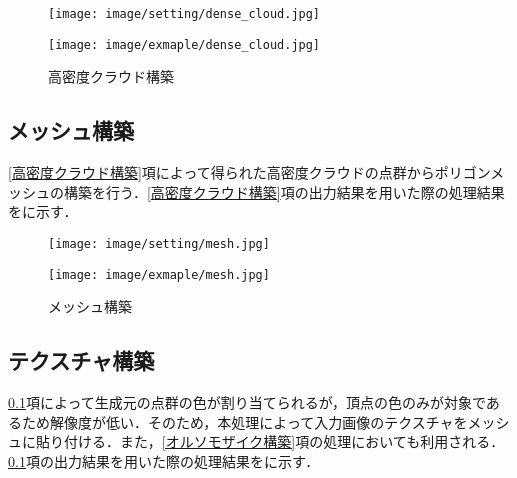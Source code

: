       \begin{figure}[tbp]
        \begin{minipage}[c]{0.45\hsize}
          \centering
          \texttt{[image: image/setting/dense\_cloud.jpg]}
          \label{高密度クラウド構築設定値}
        \end{minipage}
        \begin{minipage}[c]{0.45\hsize}
          \centering
          \texttt{[image: image/exmaple/dense\_cloud.jpg]}
        \end{minipage}
        \caption{高密度クラウド構築}
        \label{高密度クラウド構築結果}
      \end{figure}


    \subsection{メッシュ構築}
      \label{メッシュ構築}
      \ref{高密度クラウド構築}項によって得られた高密度クラウドの点群からポリゴンメッシュの構築を行う．\ref{高密度クラウド構築}項の出力結果を用いた際の処理結果をに示す．

      \begin{figure}[tbp]
        \begin{minipage}[c]{0.45\hsize}
          \centering
          \texttt{[image: image/setting/mesh.jpg]}
        \end{minipage}
        \begin{minipage}[c]{0.45\hsize}
          \centering
          \texttt{[image: image/exmaple/mesh.jpg]}
        \end{minipage}
        \caption{メッシュ構築}
        \label{メッシュ構築結果}
      \end{figure}


    \subsection{テクスチャ構築}
      \label{テクスチャ構築}
      \ref{メッシュ構築}項によって生成元の点群の色が割り当てられるが，頂点の色のみが対象であるため解像度が低い．そのため，本処理によって入力画像のテクスチャをメッシュに貼り付ける．また，\ref{オルソモザイク構築}項の処理においても利用される．\ref{メッシュ構築}項の出力結果を用いた際の処理結果をに示す．

